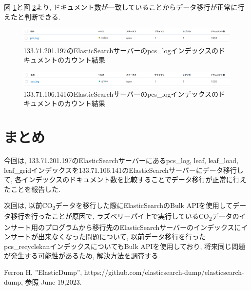 \documentclass[a4j,12pt,]{jarticle}
\begin{document}
図 \ref{p4}と図 \ref{p5}より, ドキュメント数が一致していることからデータ移行が正常に行えたと判断できる.

\begin{figure}[H]
  \begin{center}
    \includegraphics[width=160mm]{197pcs.png}
    \caption{133.71.201.197のElasticSearchサーバーのpcs\_logインデックスのドキュメントのカウント結果}
    \label{p4}
  \end{center}
\end{figure}

\begin{figure}[H]
  \begin{center}
    \includegraphics[width=160mm]{141pcs.png}
    \caption{133.71.106.141のElasticSearchサーバーのpcs\_logインデックスのドキュメントのカウント結果}
    \label{p5}
  \end{center}
\end{figure}

\section{まとめ}
今回は, 133.71.201.197のElasticSearchサーバーにあるpcs\_log, leaf, leaf\_load, leaf\_gridインデックスを133.71.106.141のElasticSearchサーバーにデータ移行して, 各インデックスのドキュメント数を比較することでデータ移行が正常に行えたことを報告した.


次回は, 以前CO\textsubscript{2}データを移行した際にElasticSearchのBulk APIを使用してデータ移行を行ったことが原因で, ラズベリーパイ上で実行しているCO\textsubscript{2}データのインサート用のプログラムから移行先のElasticSearchサーバーのインデックスにインサートが出来なくなった問題について, 以前データ移行を行ったpcs\_recyclekanインデックスについてもBulk APIを使用しており, 将来同じ問題が発生する可能性があるため, 解決方法を調査する.

\begin{thebibliography}{5}
  Ferron H, ”ElasticDump”, https://github.com/elasticsearch-dump/elasticsearch-dump, 参照 June 19,2023.
\end{thebibliography}
\end{document}
